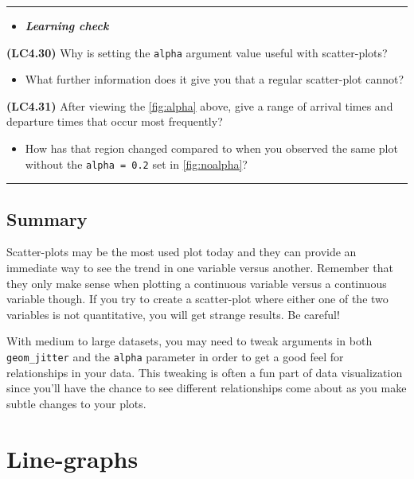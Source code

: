 \documentclass[]{tufte-book}
\let\oldrule=\rule
\renewcommand{\rule}[1]{\oldrule{\linewidth}}
\providecommand{\tightlist}{%
  \setlength{\itemsep}{0pt}\setlength{\parskip}{0pt}}
\newenvironment{rmdblock}[1]
  {\begin{shaded*}
  \begin{itemize}
  \renewcommand{\labelitemi}{
    \raisebox{-.7\height}[0pt][0pt]{
    }
  }
  \item
  }
  {
  \end{itemize}
  \end{shaded*}
  }
\newenvironment{learncheck}
  {\begin{rmdblock}{warning}}
  {\end{rmdblock}}
\begin{document}
\begin{center}\rule{0.5\linewidth}{\linethickness}\end{center}

\begin{learncheck}
\textbf{\emph{Learning check}}
\end{learncheck}

\textbf{(LC4.30)} Why is setting the \texttt{alpha} argument value
useful with scatter-plots?

\begin{itemize}
\tightlist
\item
  What further information does it give you that a regular scatter-plot
  cannot?
\end{itemize}

\textbf{(LC4.31)} After viewing the \ref{fig:alpha} above, give a range
of arrival times and departure times that occur most frequently?

\begin{itemize}
\tightlist
\item
  How has that region changed compared to when you observed the same
  plot without the \texttt{alpha\ =\ 0.2} set in \ref{fig:noalpha}?
\end{itemize}

\begin{center}\rule{0.5\linewidth}{\linethickness}\end{center}

\subsection{Summary}\label{summary-3}

Scatter-plots may be the most used plot today and they can provide an
immediate way to see the trend in one variable versus another. Remember
that they only make sense when plotting a continuous variable versus a
continuous variable though. If you try to create a scatter-plot where
either one of the two variables is not quantitative, you will get
strange results. Be careful!

With medium to large datasets, you may need to tweak arguments in both
\texttt{geom\_jitter} and the \texttt{alpha} parameter in order to get a
good feel for relationships in your data. This tweaking is often a fun
part of data visualization since you'll have the chance to see different
relationships come about as you make subtle changes to your plots.

\section{Line-graphs}\label{line-graphs}
\end{document}
